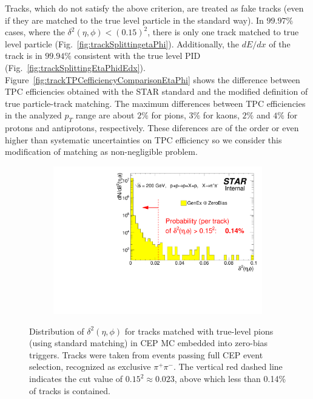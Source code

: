 Tracks, which do not satisfy the above criterion, are treated as fake tracks (even if they are matched to the true level particle in the standard way). In $99.97\%$ cases, where the $\delta^{2}\left(\eta,\phi\right)<\left(0.15\right)^2$, there is only one track matched to true level particle (Fig.~\ref{fig:trackSplittingetaPhi}). Additionally, the $dE/dx$ of the track is in $99.94\%$ consistent with the true level PID (Fig.~\ref{fig:trackSplittingEtaPhidEdx}). Figure~\ref{fig:trackTPCefficiencyComparisonEtaPhi} shows the difference between TPC efficiencies obtained with the STAR standard and the modified definition of true particle-track matching. The maximum differences between TPC efficiencies in the analyzed $p_T$ range are about $2\%$ for pions, $3\%$ for kaons, $2\%$ and $4\%$ for protons and antiprotons, respectively.
These diferences are of the order or even higher than systematic uncertainties on TPC efficiency so we consider this modification of matching  as non-negligible problem.

\begin{figure}[h!]%
	\centering
	\parbox{0.685\textwidth}{
		\centering
		\begin{subfigure}[b]{\linewidth}
			\includegraphics[width=\linewidth]{graphics/eff/deltaEtaSqDeltaPhiSqMatchedExclusive.pdf}
		\end{subfigure}
	}%
	\quad%
	\parbox{0.285\textwidth}{
		\centering
		\begin{minipage}[t][0.78\linewidth][t]{\linewidth}\vspace{-60pt}
			\caption[Distribution of $\delta^{2}\left(\eta,\phi\right)$ in CEP MC.]%
			{Distribution of $\delta^{2}\left(\eta,\phi\right)$ for tracks matched with true-level pions (using standard matching) in CEP MC embedded into zero-bias triggers. Tracks were taken from events passing full CEP event selection, recognized as exclusive $\pi^{+}\pi^{-}$. The vertical red dashed line indicates the cut value of $0.15^{2} \approx 0.023$, above which less than 0.14\% of tracks is contained.}%
			\label{fig:deltaSqCEP}
		\end{minipage}
	}
\end{figure}



